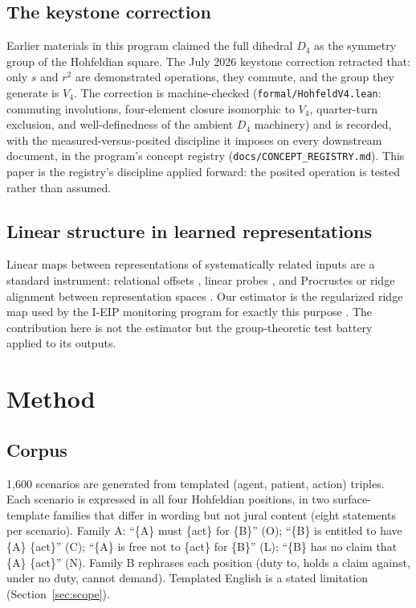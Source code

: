 \documentclass[11pt]{article}
\begin{document}
\subsection{The keystone correction}
Earlier materials in this program claimed the full dihedral $D_4$ as the symmetry group of
the Hohfeldian square. The July 2026 keystone correction retracted that: only $s$ and $r^2$
are demonstrated operations, they commute, and the group they generate is $V_4$. The
correction is machine-checked (\texttt{formal/HohfeldV4.lean}: commuting involutions,
four-element closure isomorphic to $V_4$, quarter-turn exclusion, and well-definedness of
the ambient $D_4$ machinery) and is recorded, with the measured-versus-posited discipline it
imposes on every downstream document, in the program's concept registry
(\texttt{docs/CONCEPT\_REGISTRY.md}). This paper is the registry's discipline applied
forward: the posited operation is tested rather than assumed.

\subsection{Linear structure in learned representations}
Linear maps between representations of systematically related inputs are a standard
instrument: relational offsets \cite{mikolov2013}, linear probes \cite{alain2017}, and
Procrustes or ridge alignment between representation spaces \cite{TODO-alignment}. Our
estimator is the regularized ridge map used by the I-EIP monitoring program for exactly
this purpose \cite{ieipwhitepaper}. The contribution here is not the estimator but the
group-theoretic test battery applied to its outputs.

\section{Method}

\subsection{Corpus}
1{,}600 scenarios are generated from templated (agent, patient, action) triples. Each
scenario is expressed in all four Hohfeldian positions, in two surface-template families
that differ in wording but not jural content (eight statements per scenario). Family A:
``\{A\} must \{act\} for \{B\}'' (O); ``\{B\} is entitled to have \{A\} \{act\}'' (C);
``\{A\} is free not to \{act\} for \{B\}'' (L); ``\{B\} has no claim that \{A\} \{act\}''
(N). Family B rephrases each position (duty to, holds a claim against, under no duty,
cannot demand). Templated English is a stated limitation (Section~\ref{sec:scope}).
\end{document}
